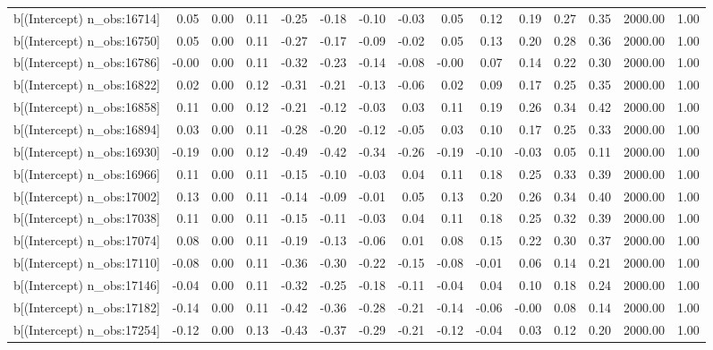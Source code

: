 \begin{table}[ht]
\begin{tabular}{rrrrrrrrrrrrrrr}
  b[(Intercept) n\_obs:16714] & 0.05 & 0.00 & 0.11 & -0.25 & -0.18 & -0.10 & -0.03 & 0.05 & 0.12 & 0.19 & 0.27 & 0.35 & 2000.00 & 1.00 \\ 
  b[(Intercept) n\_obs:16750] & 0.05 & 0.00 & 0.11 & -0.27 & -0.17 & -0.09 & -0.02 & 0.05 & 0.13 & 0.20 & 0.28 & 0.36 & 2000.00 & 1.00 \\ 
  b[(Intercept) n\_obs:16786] & -0.00 & 0.00 & 0.11 & -0.32 & -0.23 & -0.14 & -0.08 & -0.00 & 0.07 & 0.14 & 0.22 & 0.30 & 2000.00 & 1.00 \\ 
  b[(Intercept) n\_obs:16822] & 0.02 & 0.00 & 0.12 & -0.31 & -0.21 & -0.13 & -0.06 & 0.02 & 0.09 & 0.17 & 0.25 & 0.35 & 2000.00 & 1.00 \\ 
  b[(Intercept) n\_obs:16858] & 0.11 & 0.00 & 0.12 & -0.21 & -0.12 & -0.03 & 0.03 & 0.11 & 0.19 & 0.26 & 0.34 & 0.42 & 2000.00 & 1.00 \\ 
  b[(Intercept) n\_obs:16894] & 0.03 & 0.00 & 0.11 & -0.28 & -0.20 & -0.12 & -0.05 & 0.03 & 0.10 & 0.17 & 0.25 & 0.33 & 2000.00 & 1.00 \\ 
  b[(Intercept) n\_obs:16930] & -0.19 & 0.00 & 0.12 & -0.49 & -0.42 & -0.34 & -0.26 & -0.19 & -0.10 & -0.03 & 0.05 & 0.11 & 2000.00 & 1.00 \\ 
  b[(Intercept) n\_obs:16966] & 0.11 & 0.00 & 0.11 & -0.15 & -0.10 & -0.03 & 0.04 & 0.11 & 0.18 & 0.25 & 0.33 & 0.39 & 2000.00 & 1.00 \\ 
  b[(Intercept) n\_obs:17002] & 0.13 & 0.00 & 0.11 & -0.14 & -0.09 & -0.01 & 0.05 & 0.13 & 0.20 & 0.26 & 0.34 & 0.40 & 2000.00 & 1.00 \\ 
  b[(Intercept) n\_obs:17038] & 0.11 & 0.00 & 0.11 & -0.15 & -0.11 & -0.03 & 0.04 & 0.11 & 0.18 & 0.25 & 0.32 & 0.39 & 2000.00 & 1.00 \\ 
  b[(Intercept) n\_obs:17074] & 0.08 & 0.00 & 0.11 & -0.19 & -0.13 & -0.06 & 0.01 & 0.08 & 0.15 & 0.22 & 0.30 & 0.37 & 2000.00 & 1.00 \\ 
  b[(Intercept) n\_obs:17110] & -0.08 & 0.00 & 0.11 & -0.36 & -0.30 & -0.22 & -0.15 & -0.08 & -0.01 & 0.06 & 0.14 & 0.21 & 2000.00 & 1.00 \\ 
  b[(Intercept) n\_obs:17146] & -0.04 & 0.00 & 0.11 & -0.32 & -0.25 & -0.18 & -0.11 & -0.04 & 0.04 & 0.10 & 0.18 & 0.24 & 2000.00 & 1.00 \\ 
  b[(Intercept) n\_obs:17182] & -0.14 & 0.00 & 0.11 & -0.42 & -0.36 & -0.28 & -0.21 & -0.14 & -0.06 & -0.00 & 0.08 & 0.14 & 2000.00 & 1.00 \\ 
  b[(Intercept) n\_obs:17254] & -0.12 & 0.00 & 0.13 & -0.43 & -0.37 & -0.29 & -0.21 & -0.12 & -0.04 & 0.03 & 0.12 & 0.20 & 2000.00 & 1.00 \\ 

\end{tabular}
\end{table}
